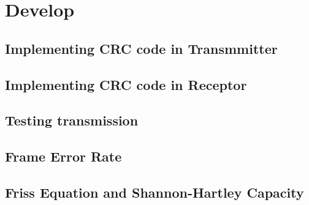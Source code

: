 \section{Develop}

\subsection{Implementing CRC code in Transmmitter}
\subsection{Implementing CRC code in Receptor}
\subsection{Testing transmission}
\subsection{Frame Error Rate}
\subsection{Friss Equation and Shannon-Hartley Capacity}

